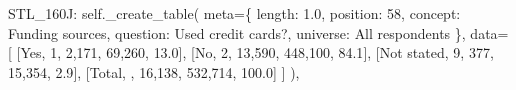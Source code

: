 \documentclass[
  11pt,
  a4paper,
]{article}
\newenvironment{Shaded}{\begin{snugshade}}{\end{snugshade}}
\newcommand{\NormalTok}[1]{\textcolor[rgb]{0.00,0.23,0.31}{#1}}
\newcommand{\OperatorTok}[1]{\textcolor[rgb]{0.37,0.37,0.37}{#1}}
\newcommand{\StringTok}[1]{\textcolor[rgb]{0.13,0.47,0.30}{#1}}
\newcommand{\VariableTok}[1]{\textcolor[rgb]{0.07,0.07,0.07}{#1}}
\begin{document}
\begin{Shaded}
\begin{Highlighting}[]
            \StringTok{\textquotesingle{}STL\_160J\textquotesingle{}}\NormalTok{: }\VariableTok{self}\NormalTok{.\_create\_table(}
\NormalTok{                meta}\OperatorTok{=}\NormalTok{\{}
                    \StringTok{\textquotesingle{}length\textquotesingle{}}\NormalTok{: }\StringTok{\textquotesingle{}1.0\textquotesingle{}}\NormalTok{, }\StringTok{\textquotesingle{}position\textquotesingle{}}\NormalTok{: }\StringTok{\textquotesingle{}58\textquotesingle{}}\NormalTok{,}
                    \StringTok{\textquotesingle{}concept\textquotesingle{}}\NormalTok{: }\StringTok{\textquotesingle{}Funding sources\textquotesingle{}}\NormalTok{,}
                    \StringTok{\textquotesingle{}question\textquotesingle{}}\NormalTok{: }\StringTok{\textquotesingle{}Used credit cards?\textquotesingle{}}\NormalTok{,}
                    \StringTok{\textquotesingle{}universe\textquotesingle{}}\NormalTok{: }\StringTok{\textquotesingle{}All respondents\textquotesingle{}}
\NormalTok{                \},}
\NormalTok{                data}\OperatorTok{=}\NormalTok{[}
\NormalTok{                    [}\StringTok{\textquotesingle{}Yes\textquotesingle{}}\NormalTok{, }\StringTok{\textquotesingle{}1\textquotesingle{}}\NormalTok{, }\StringTok{\textquotesingle{}2,171\textquotesingle{}}\NormalTok{, }\StringTok{\textquotesingle{}69,260\textquotesingle{}}\NormalTok{, }\StringTok{\textquotesingle{}13.0\textquotesingle{}}\NormalTok{],}
\NormalTok{                    [}\StringTok{\textquotesingle{}No\textquotesingle{}}\NormalTok{, }\StringTok{\textquotesingle{}2\textquotesingle{}}\NormalTok{, }\StringTok{\textquotesingle{}13,590\textquotesingle{}}\NormalTok{, }\StringTok{\textquotesingle{}448,100\textquotesingle{}}\NormalTok{, }\StringTok{\textquotesingle{}84.1\textquotesingle{}}\NormalTok{],}
\NormalTok{                    [}\StringTok{\textquotesingle{}Not stated\textquotesingle{}}\NormalTok{, }\StringTok{\textquotesingle{}9\textquotesingle{}}\NormalTok{, }\StringTok{\textquotesingle{}377\textquotesingle{}}\NormalTok{, }\StringTok{\textquotesingle{}15,354\textquotesingle{}}\NormalTok{, }\StringTok{\textquotesingle{}2.9\textquotesingle{}}\NormalTok{],}
\NormalTok{                    [}\StringTok{\textquotesingle{}Total\textquotesingle{}}\NormalTok{, }\StringTok{\textquotesingle{}\textquotesingle{}}\NormalTok{, }\StringTok{\textquotesingle{}16,138\textquotesingle{}}\NormalTok{, }\StringTok{\textquotesingle{}532,714\textquotesingle{}}\NormalTok{, }\StringTok{\textquotesingle{}100.0\textquotesingle{}}\NormalTok{]}
\NormalTok{                ]}
\NormalTok{            ),}
            

\end{Highlighting}
\end{Shaded}
\end{document}
